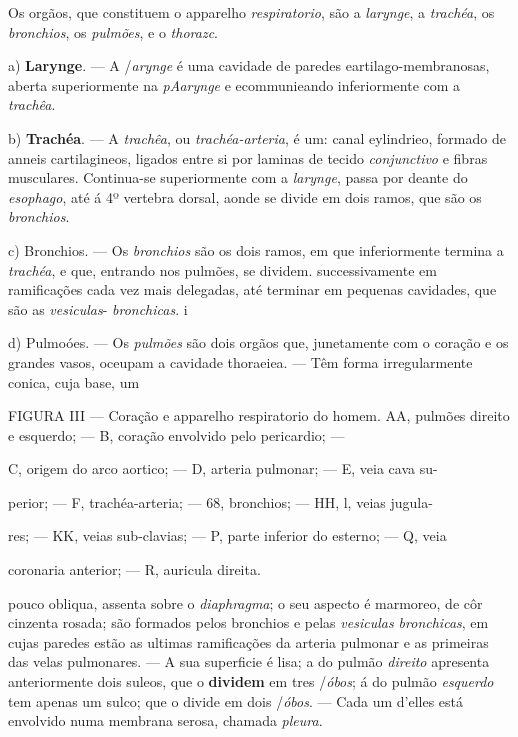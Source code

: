 
  
Os orgãos, que constituem o apparelho \emph{respiratorio}, são a \emph{larynge}, a \emph{trachéa}, os \emph{bronchios}, os \emph{pulmões}, e o \emph{thorazc}.

a) \textbf{Larynge}. --- A /\emph{arynge} é uma cavidade de paredes eartilago-membranosas, aberta superiormente na \emph{pAarynge} e ecommunieando inferiormente com a \emph{trachêa}.

b) \textbf{Trachéa}. --- A \emph{trachêa}, ou \emph{trachéa-arteria}, é um: canal eylindrieo, formado de anneis cartilagineos, ligados entre si por laminas de tecido \emph{conjunctivo} e fibras musculares. Continua-se superiormente com a \emph{larynge}, passa por deante do   \emph{esophago}, até á 4º vertebra dorsal, aonde se divide em dois ramos, que são os \emph{bronchios}.

c) Bronchios. --- Os \emph{bronchios} são os dois ramos, em que inferiormente termina a \emph{trachéa}, e que, entrando nos pulmões, se dividem. successivamente em ramificações cada vez mais delegadas, até terminar em pequenas cavidades, que são as \emph{vesiculas}- \emph{bronchicas}. i

d) Pulmoóes. --- Os \emph{pulmões} são dois orgãos que, junetamente com o coração e os grandes vasos, oceupam a cavidade thoraeiea. --- Têm forma irregularmente conica, cuja base, um

FIGURA III --- Coração e apparelho respiratorio do homem. AA, pulmões direito e esquerdo; --- B, coração envolvido pelo pericardio; ---

C, origem do arco aortico; --- D, arteria pulmonar; --- E, veia cava su-

perior; --- F, trachéa-arteria; --- 68, bronchios; --- HH, \textbar{}l, veias jugula-

res; --- KK, veias sub-clavias; --- P, parte inferior do esterno; --- Q, veia

coronaria anterior; --- R, auricula direita.

pouco obliqua, assenta sobre o \emph{diaphragma}; o seu aspecto é marmoreo, de côr cinzenta rosada; são formados pelos bronchios e pelas \emph{vesiculas bronchicas}, em cujas paredes estão as ultimas ramificações da arteria pulmonar e as primeiras das velas pulmonares. --- A sua superficie é lisa; a do pulmão \emph{direito} apresenta anteriormente dois suleos, que o \textbf{dividem}   em tres /\emph{óbos}; á do pulmão \emph{esquerdo} tem apenas um sulco; que o divide em dois /\emph{óbos}. --- Cada um d'elles está envolvido numa membrana serosa, chamada \emph{pleura}.

